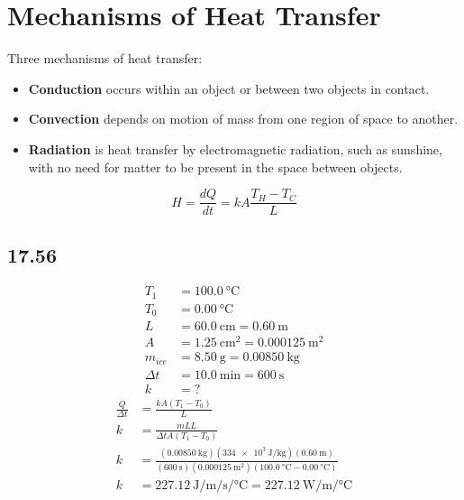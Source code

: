 \documentclass{article}
\begin{document}
\section{Mechanisms of Heat Transfer}

Three mechanisms of heat transfer:
\begin{itemize}
	\item \textbf{Conduction} occurs within an object or between two objects in contact. \\
	\item \textbf{Convection} depends on motion of mass from one region of space to another.
	\item \textbf{Radiation} is heat transfer by electromagnetic radiation, such as sunshine, with no need for matter to be present in the space between objects.
\end{itemize}

\begin{equation}
	H = \frac{ dQ }{ dt} = kA\frac{ T_H - T_C }{ L }
\end{equation}

\subsection{17.56}

\begin{align*}
	T_1 & = \SI{100.0}{\celsius} \\
	T_0 & = \SI{0.00}{\celsius} \\
	L & = \SI{60.0}{\centi \meter} = \SI{0.60}{\meter} \\
	A & = \SI{1.25}{\centi \meter \squared} = \SI{0.000125}{\meter \squared} \\
	m_{ice} & = \SI{8.50}{\gram} = \SI{0.00850}{\kilogram} \\
	\Delta t & = \SI{10.0}{\minute} = \SI{600}{\second} \\
	k & = ?
\end{align*}
\begin{align*}
	\frac{ Q }{ \Delta t } & = \frac{ kA(T_1 - T_0) }{ L } \\
	k & = \frac{ mLL }{ \Delta t A(T_1 - T_0) } \\
	k & = \frac{ (\SI{0.00850}{\kilogram})(\SI{334e3}{\joule \per \kilogram})(\SI{0.60}{\meter}) }{ (\SI{600}{\second})(\SI{0.000125}{\meter \squared})(\SI{100.0}{\celsius} - \SI{0.00}{\celsius}) } \\
	k & = \SI{227.12}{\joule \per \meter \per \second \per \celsius} = \SI{227.12}{\watt \per \meter \per \celsius}
\end{align*}
\end{document}
